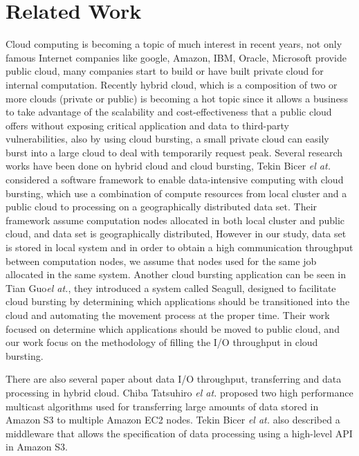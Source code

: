 \section{Related Work}
\label{sec:related_work}
Cloud computing is becoming a topic of much interest in recent years, not only famous Internet companies like google, Amazon, IBM, Oracle, Microsoft provide public cloud, many companies start to build or have built private cloud for internal computation. Recently hybrid cloud, which is a composition of two or more clouds (private or public) is becoming a hot topic since it allows a business to take advantage of the scalability and cost-effectiveness that a public cloud offers without exposing critical application and data to third-party vulnerabilities, also by using cloud bursting, a small private cloud can easily burst into a large cloud to deal with temporarily request peak. 
Several research works have been done on hybrid cloud and cloud bursting, Tekin Bicer \emph{el at.}\cite{time_and_cost} considered a software framework to enable data-intensive computing with cloud bursting, which use a combination of compute resources from local cluster and a public cloud to processing on a geographically distributed data set.
Their framework assume computation nodes allocated in both local cluster and public cloud, and data set is geographically distributed, However in our study, data set is stored in local system and in order to obtain a high communication throughput between computation nodes, we assume that nodes used for the same job allocated in the same system.
Another cloud bursting application can be seen in Tian Guo\emph{el at.}\cite{Seagull}, they introduced a system called Seagull, designed to facilitate cloud bursting by determining which applications should be transitioned into the cloud and automating the movement process at the proper time. Their work focused on determine which applications should be moved to public cloud, and our work focus on the methodology of filling the I/O throughput in cloud bursting.

There are also several paper about data I/O throughput, transferring and data processing in hybrid cloud.
Chiba Tatsuhiro \emph{el at.}\cite{Chiba} proposed two high performance multicast algorithms used for transferring large amounts of data stored in Amazon S3 to multiple Amazon EC2 nodes.
Tekin Bicer \emph{el at.}\cite{MATE-EC2} also described a middleware that allows the specification of data processing using a high-level API in Amazon S3.
